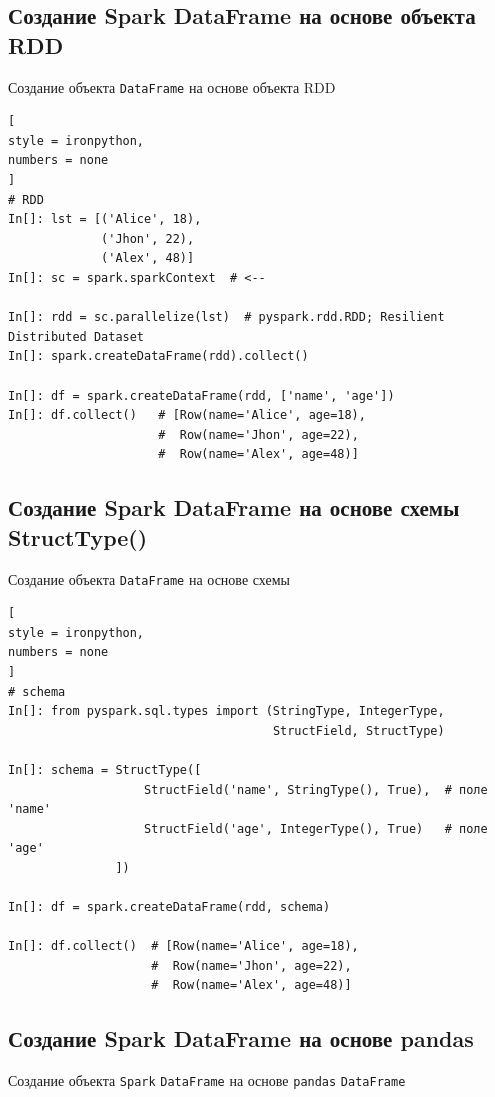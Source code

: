 \documentclass[%
	11pt,
	a4paper,
	utf8,
		]{article}
\begin{document}
\subsection{Создание Spark DataFrame на основе объекта RDD}

Создание объекта \texttt{DataFrame} на основе объекта RDD

\begin{lstlisting}[
style = ironpython,
numbers = none
]
# RDD
In[]: lst = [('Alice', 18),
             ('Jhon', 22),
             ('Alex', 48)]
In[]: sc = spark.sparkContext  # <--

In[]: rdd = sc.parallelize(lst)  # pyspark.rdd.RDD; Resilient Distributed Dataset
In[]: spark.createDataFrame(rdd).collect()

In[]: df = spark.createDataFrame(rdd, ['name', 'age'])
In[]: df.collect()   # [Row(name='Alice', age=18),
                     #  Row(name='Jhon', age=22),
                     #  Row(name='Alex', age=48)]
\end{lstlisting}

\subsection{Создание Spark DataFrame на основе схемы StructType()}

Создание объекта \texttt{DataFrame} на основе схемы

\begin{lstlisting}[
style = ironpython,
numbers = none
]
# schema
In[]: from pyspark.sql.types import (StringType, IntegerType,
                                     StructField, StructType)

In[]: schema = StructType([
                   StructField('name', StringType(), True),  # поле 'name'
                   StructField('age', IntegerType(), True)   # поле 'age'
               ])

In[]: df = spark.createDataFrame(rdd, schema)

In[]: df.collect()  # [Row(name='Alice', age=18),
                    #  Row(name='Jhon', age=22),
                    #  Row(name='Alex', age=48)]                               
\end{lstlisting}

\subsection{Создание Spark DataFrame на основе pandas}

Создание объекта \texttt{Spark} \texttt{DataFrame} на основе \texttt{pandas} \texttt{DataFrame}
\end{document}
